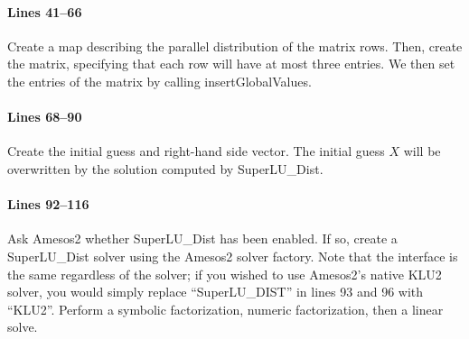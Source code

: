 \paragraph{Lines 41--66}
Create a map describing the parallel distribution of the matrix rows.  Then,
create the matrix, specifying that each row will have at most three entries.  We
then set the entries of the matrix by calling insertGlobalValues.

\paragraph{Lines 68--90}
Create the initial guess and right-hand side vector.  The initial guess $X$ will
be overwritten by the solution computed by SuperLU\_Dist.

\paragraph{Lines 92--116}
Ask Amesos2 whether SuperLU\_Dist has been enabled.  If so, create a
SuperLU\_Dist solver using the Amesos2 solver factory.  Note that the interface
is the same regardless of the solver; if you wished to use Amesos2's native KLU2
solver, you would simply replace ``SuperLU\_DIST'' in lines 93 and 96 with
``KLU2''.  Perform a symbolic factorization, numeric factorization, then a
linear solve.  
